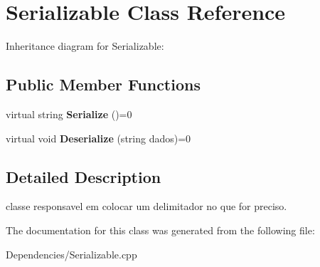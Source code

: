 \hypertarget{class_serializable}{}\section{Serializable Class Reference}
\label{class_serializable}


Inheritance diagram for Serializable\+:
\subsection*{Public Member Functions}
\begin{DoxyCompactItemize}
\item 
virtual string {\bfseries Serialize} ()=0\hypertarget{class_serializable_ada131693fefc613e7cb956cd983b4d4e}{}\label{class_serializable_ada131693fefc613e7cb956cd983b4d4e}

\item 
virtual void {\bfseries Deserialize} (string dados)=0\hypertarget{class_serializable_a81284267f7ff0c163349ddf0f3a57103}{}\label{class_serializable_a81284267f7ff0c163349ddf0f3a57103}

\end{DoxyCompactItemize}


\subsection{Detailed Description}
classe responsavel em colocar um delimitador no que for preciso. 

The documentation for this class was generated from the following file\+:\begin{DoxyCompactItemize}
\item 
Dependencies/Serializable.\+cpp\end{DoxyCompactItemize}
